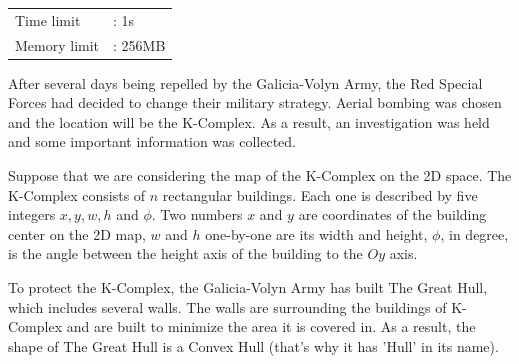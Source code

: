 \documentclass[12pt]{article}
\begin{document}
	\vspace{-0.5cm}
	\begin{table}[!h]
		\hspace{1cm}
		\begin{tabular}{ll}
			Time limit   &:  1s        \\
			Memory limit &:  256MB         \\
		\end{tabular}
	\end{table}
	
	After several days being repelled by the Galicia-Volyn Army, the Red Special Forces had decided to change their military strategy. Aerial bombing was chosen and the location will be the K-Complex. As a result,  an investigation was held and some important information was collected.
	
	Suppose that we are considering the map of the K-Complex on the 2D space. The K-Complex consists of $n$ rectangular buildings. Each one is described by five integers $x,y,w,h$ and $\phi$. Two numbers $x$ and $y$ are coordinates of the building center on the 2D map, $w$ and $h$ one-by-one are its width and height, $\phi$, in degree, is the angle between the height axis of the building to the $Oy$ axis.
	
	To protect the K-Complex, the Galicia-Volyn Army has built The Great Hull, which includes several walls. The walls are surrounding the buildings of K-Complex and are built to minimize the area it is covered in. As a result, the shape of The Great Hull is a Convex Hull (that's why it has 'Hull' in its name).
	
\begin{center}
\end{center}
	
\end{document}
